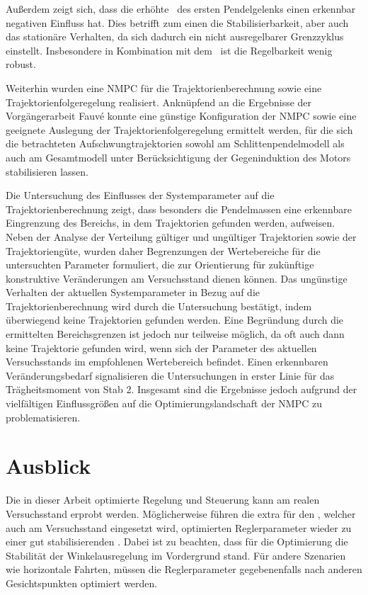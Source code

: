 Außerdem zeigt sich, dass die erhöhte \crb\ des ersten Pendelgelenks einen erkennbar negativen Einfluss hat.
Dies betrifft zum einen die Stabilisierbarkeit, aber auch das stationäre Verhalten, da sich dadurch ein nicht ausregelbarer Grenzzyklus einstellt.
Insbesondere in Kombination mit dem \beob\ ist die Regelbarkeit wenig robust.

Weiterhin wurden eine NMPC für die Trajektorienberechnung sowie eine Trajektorienfolgeregelung realisiert. Anknüpfend an die Ergebnisse der Vorgängerarbeit Fauvé \cite{fauve} konnte eine günstige Konfiguration der NMPC sowie eine geeignete Auslegung der Trajektorienfolgeregelung ermittelt werden, für die sich die betrachteten Aufschwungtrajektorien sowohl am Schlittenpendelmodell als auch am Gesamtmodell unter Berücksichtigung der Gegeninduktion des Motors stabilisieren lassen.

Die Untersuchung des Einflusses der Systemparameter auf die Trajektorienberechnung zeigt, dass besonders die Pendelmassen eine erkennbare Eingrenzung des Bereichs, in dem Trajektorien gefunden werden, aufweisen. Neben der Analyse der Verteilung gültiger und ungültiger Trajektorien sowie der Trajektoriengüte, wurden daher Begrenzungen der Wertebereiche für die untersuchten Parameter formuliert, die zur Orientierung für zukünftige konstruktive Veränderungen am Versuchsstand dienen können. 
Das ungünstige Verhalten der aktuellen Systemparameter in Bezug auf die Trajektorienberechnung wird durch die Untersuchung bestätigt, indem überwiegend keine Trajektorien gefunden werden. %
Eine Begründung durch die ermittelten Bereichsgrenzen ist jedoch nur teilweise möglich, da oft auch dann keine Trajektorie gefunden wird, wenn sich der Parameter des aktuellen Versuchsstands im empfohlenen Wertebereich befindet. Einen erkennbaren Veränderungsbedarf signalisieren die Untersuchungen in erster Linie für das Trägheitsmoment von Stab 2. 
Insgesamt sind die Ergebnisse jedoch aufgrund der vielfältigen Einflussgrößen auf die Optimierungslandschaft der NMPC zu problematisieren. %

  

\section{Ausblick}

Die in dieser Arbeit optimierte Regelung und Steuerung kann am realen Versuchsstand erprobt werden.
Möglicherweise führen die extra für den \beob, welcher auch am Versuchsstand eingesetzt wird, optimierten Reglerparameter wieder zu einer gut stabilisierenden \aprg.
Dabei ist zu beachten, dass für die Optimierung die Stabilität der Winkelausregelung im Vordergrund stand.
Für andere Szenarien wie horizontale Fahrten, müssen die Reglerparameter gegebenenfalls nach anderen Gesichtspunkten optimiert werden.

